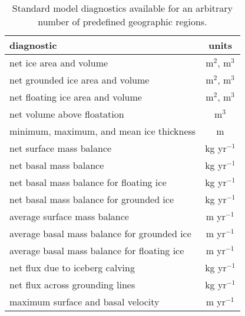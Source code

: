 \begin{table*}[t]
\caption{Standard model diagnostics available for an arbitrary number of predefined geographic regions.
}
\begin{tabular}{lc}
\hline
diagnostic & units \\
\hline
net ice area and volume & m$^2$, m$^3$ \\
net grounded ice area and volume & m$^2$, m$^3$ \\
net floating ice area and volume & m$^2$, m$^3$ \\
net volume above floatation & m$^3$ \\
minimum, maximum, and mean ice thickness & m \\
net surface mass balance & kg yr$^{-1}$ \\
net basal mass balance & kg yr$^{-1}$ \\
net basal mass balance for floating ice & kg yr$^{-1}$ \\
net basal mass balance for grounded ice & kg yr$^{-1}$ \\
average surface mass balance & m yr$^{-1}$ \\
average basal mass balance for grounded ice & m yr$^{-1}$ \\
average basal mass balance for floating ice & m yr$^{-1}$ \\
net flux due to iceberg calving & kg yr$^{-1}$ \\
net flux across grounding lines & kg yr$^{-1}$ \\
maximum surface and basal velocity & m yr$^{-1}$ \\
\hline
\end{tabular}
\label{table:analysisVars}
\end{table*}


